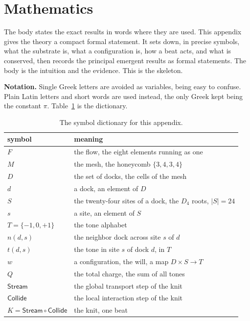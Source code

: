 \section{Mathematics}

The body states the exact results in words where they are used. This appendix gives the theory a compact formal statement. It sets down, in precise symbols, what the substrate is, what a configuration is, how a beat acts, and what is conserved, then records the principal emergent results as formal statements. The body is the intuition and the evidence. This is the skeleton.

\textbf{Notation.} Single Greek letters are avoided as variables, being easy to confuse. Plain Latin letters and short words are used instead, the only Greek kept being the constant $\pi$. Table~\ref{tab:symbols} is the dictionary.

\begin{table}[ht]
\centering
\small
\begin{tabular}{@{}ll@{}}
\toprule
symbol & meaning \\
\midrule
$F$ & the flow, the eight elements running as one \\
$M$ & the mesh, the honeycomb $\{3,4,3,4\}$ \\
$D$ & the set of docks, the cells of the mesh \\
$d$ & a dock, an element of $D$ \\
$S$ & the twenty-four sites of a dock, the $D_4$ roots, $|S| = 24$ \\
$s$ & a site, an element of $S$ \\
$T = \{-1,0,+1\}$ & the tone alphabet \\
$n(d, s)$ & the neighbor dock across site $s$ of $d$ \\
$t(d, s)$ & the tone in site $s$ of dock $d$, in $T$ \\
$w$ & a configuration, the will, a map $D \times S \to T$ \\
$Q$ & the total charge, the sum of all tones \\
$\mathsf{Stream}$ & the global transport step of the knit \\
$\mathsf{Collide}$ & the local interaction step of the knit \\
$K = \mathsf{Stream} \circ \mathsf{Collide}$ & the knit, one beat \\
\bottomrule
\end{tabular}
\caption{The symbol dictionary for this appendix.}
\label{tab:symbols}
\end{table}

